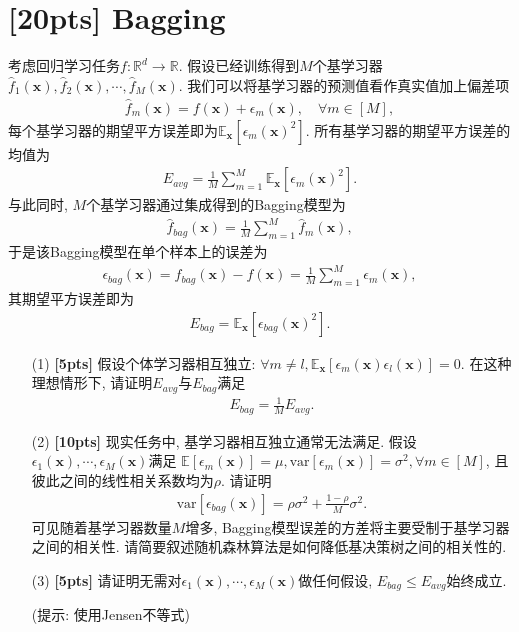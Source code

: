 \documentclass[a4paper,UTF8]{article}
\numberwithin{equation}{section}
\theoremstyle{definition}
\def \x {\boldsymbol{x}}
\begin{document}
\newpage

\section{[20pts] Bagging}
考虑回归学习任务$f: \mathbb{R}^d \to \mathbb{R}$. 假设已经训练得到$M$个基学习器$\hat f_1(\x), \hat f_2(\x), \cdots, \hat f_M(\x)$.
我们可以将基学习器的预测值看作真实值加上偏差项
\begin{align*}
    \hat f_m(\x) = f(\x) + \epsilon_m(\x), \quad \forall m \in [M],
\end{align*}
每个基学习器的期望平方误差即为$\mathbb{E}_{\x}\left[\epsilon_m(\x)^2\right]$. 所有基学习器的期望平方误差的均值为
\begin{align*}
    E_{avg} = \frac{1}{M} \sum_{m=1}^M \mathbb{E}_{\x} \left[\epsilon_m(\x)^2\right].
\end{align*}
与此同时, $M$个基学习器通过集成得到的Bagging模型为
\begin{align*}
    \hat f_{bag}(\x) = \frac{1}{M} \sum_{m=1}^M \hat f_m(\x),
\end{align*}
于是该Bagging模型在单个样本上的误差为
\begin{align*}
    \epsilon_{bag}(\x) = \hat f_{bag}(\x) - f(\x) = \frac{1}{M} \sum_{m=1}^M \epsilon_m(\x),
\end{align*}
其期望平方误差即为
\begin{align*}
    E_{bag} = \mathbb{E}_{\x}\left[\epsilon_{bag}(\x)^2\right].
\end{align*}

\begin{enumerate}
    \item[(1)] \textbf{[5pts]} 假设个体学习器相互独立: $\forall m \neq l, \mathbb{E}_{\x}[\epsilon_m(\x)\epsilon_{l}(\x)] = 0$. 在这种理想情形下, 请证明$E_{avg}$与$E_{bag}$满足
    \begin{align*}
        E_{bag} = \frac{1}{M} E_{avg}.
    \end{align*}
    \item[(2)] \textbf{[10pts]} 现实任务中, 基学习器相互独立通常无法满足. 假设$\epsilon_1(\x), \cdots, \epsilon_M(\x)$满足
    $\mathbb{E}[\epsilon_m(\x)] = \mu, \text{var}[\epsilon_m(\x)] = \sigma^2, \forall m \in [M]$, 且彼此之间的线性相关系数均为$\rho$. 请证明
    \begin{align*}
        \text{var}[\epsilon_{bag}(\x)] = \rho \sigma^2 + \frac{1 - \rho}{M}\sigma^2.
    \end{align*}
    可见随着基学习器数量$M$增多, Bagging模型误差的方差将主要受制于基学习器之间的相关性. 
    请简要叙述随机森林算法是如何降低基决策树之间的相关性的. 
    \item[(3)] \textbf{[5pts]} 请证明无需对$\epsilon_1(\x), \cdots, \epsilon_M(\x)$做任何假设, $E_{bag} \leq E_{avg}$始终成立.
    
    (提示: 使用Jensen不等式)
\end{enumerate}
\end{document}
